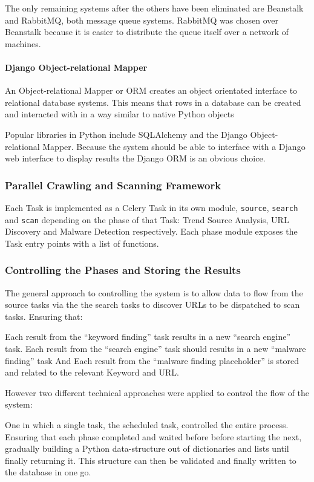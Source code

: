 The only remaining systems after the others have been eliminated are Beanstalk and RabbitMQ, both message queue systems. RabbitMQ was chosen over Beanstalk because it is easier to distribute the queue itself over a network of machines.

\paragraph{Django Object-relational Mapper} %
An Object-relational Mapper or ORM creates an object orientated interface to relational database systems.  This means that rows in a database can be created and interacted with in a way similar to native Python objects

Popular libraries in Python include SQLAlchemy and the Django Object-relational Mapper. Because the system should be able to interface with a Django web interface to display results the Django ORM is an obvious choice.

\subsubsection{Parallel Crawling and Scanning Framework}
Each Task is implemented as a Celery Task in its own module, \verb`source`, \verb`search` and \verb`scan` depending on the phase of that Task: Trend Source Analysis, URL Discovery and Malware Detection respectively. Each phase module exposes the Task entry points with a list of functions.

\subsubsection{Controlling the Phases and Storing the Results}
The general approach to controlling the system is to allow data to flow from the source tasks via the the search tasks to discover URLs to be dispatched to scan tasks. Ensuring that:

Each result from the ``keyword finding'' task results in a new ``search engine'' task.
Each result from the ``search engine'' task should results in a new ``malware finding'' task
And Each result from the ``malware finding placeholder'' is stored and related to the relevant Keyword and URL.

However two different technical approaches were applied to control the flow of the system:

One in which a single task, the scheduled task, controlled the entire process.  Ensuring that each phase completed and waited before before starting the next, gradually building a Python data-structure out of dictionaries and lists until finally returning it.  This structure can then be validated and finally written to the database in one go.


